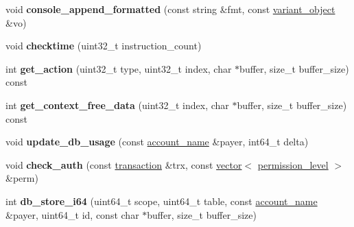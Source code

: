 \begin{DoxyCompactItemize}
void {\bfseries console\+\_\+append\+\_\+formatted} (const string \&fmt, const \mbox{\hyperlink{classfc_1_1variant__object}{variant\+\_\+object}} \&vo)
\item 
\mbox{\label{classaacio_1_1chain_1_1apply__context_abf1744d1dd45355ef008a96e7166a84a}} 
void {\bfseries checktime} (uint32\+\_\+t instruction\+\_\+count)
\item 
\mbox{\label{classaacio_1_1chain_1_1apply__context_af44c01ddf1b9091744606a1bfe3de951}} 
int {\bfseries get\+\_\+action} (uint32\+\_\+t type, uint32\+\_\+t index, char $\ast$buffer, size\+\_\+t buffer\+\_\+size) const
\item 
\mbox{\label{classaacio_1_1chain_1_1apply__context_aae0601e2fef65641f3b7bac935f41fd9}} 
int {\bfseries get\+\_\+context\+\_\+free\+\_\+data} (uint32\+\_\+t index, char $\ast$buffer, size\+\_\+t buffer\+\_\+size) const
\item 
\mbox{\label{classaacio_1_1chain_1_1apply__context_a97f315483b688590b27e002872069ee4}} 
void {\bfseries update\+\_\+db\+\_\+usage} (const \mbox{\hyperlink{structaacio_1_1chain_1_1name}{account\+\_\+name}} \&payer, int64\+\_\+t delta)
\item 
\mbox{\label{classaacio_1_1chain_1_1apply__context_a62bcd74e9c5f78b106ce58e45bd45885}} 
void {\bfseries check\+\_\+auth} (const \mbox{\hyperlink{structaacio_1_1chain_1_1transaction}{transaction}} \&trx, const \mbox{\hyperlink{classstd_1_1vector}{vector}}$<$ \mbox{\hyperlink{structaacio_1_1chain_1_1permission__level}{permission\+\_\+level}} $>$ \&perm)
\item 
\mbox{\label{classaacio_1_1chain_1_1apply__context_a8f73a6c080b388127ba5ad8f3dc3ea67}} 
int {\bfseries db\+\_\+store\+\_\+i64} (uint64\+\_\+t scope, uint64\+\_\+t table, const \mbox{\hyperlink{structaacio_1_1chain_1_1name}{account\+\_\+name}} \&payer, uint64\+\_\+t id, const char $\ast$buffer, size\+\_\+t buffer\+\_\+size)
\item 
\mbox{\label{classaacio_1_1chain_1_1apply__context_ad8d89abc8c7e3c013b9a65e274d34af9}} 

\end{DoxyCompactItemize}
